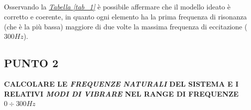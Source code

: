 \documentclass[12pt, a4paper]{article}
\begin{document}
	\\\\
	\begin{table}[h]
		\centering
		\caption{}
	\end{table}
	\\\\
	Osservando la \textit{\underline{Tabella \ref{tab_1}}} è possibile affermare che il modello ideato è corretto e coerente, in quanto ogni elemento ha la prima frequenza di risonanza (che è la più bassa) maggiore di due volte la massima frequenza di eccitazione ($300Hz$).
	
	
	\subsection{PUNTO 2}
	\textbf{CALCOLARE LE \textit{FREQUENZE NATURALI} DEL SISTEMA E I RELATIVI \textit{MODI DI VIBRARE} NEL RANGE DI FREQUENZE $0\div300Hz$}
    
\end{document}
